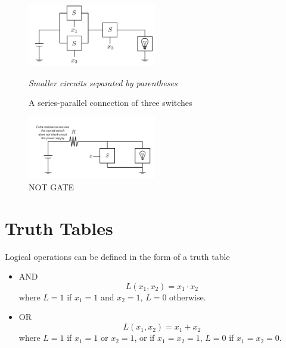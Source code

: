 \documentclass[12pt,openany, tikz,border=10pt]{book}
\begin{document}
\begin{figure}[htp] %
    \centering
    \includegraphics[width=0.5\textwidth]{circuits/6.1.3_3.png} %
    \caption*{A series-parallel connection of three switches}
     \newline
    \textit{Smaller circuits separated by parentheses}
  \end{figure}


  \begin{figure}[htp]
    \centering
    \includegraphics[width=0.5\textwidth]{circuits/6.1.3_4.png} %
    \caption*{NOT GATE} %
    \label{fig:notgate} %
    \medskip %
  \end{figure}
  \newpage
  \section{Truth Tables}
  Logical operations can be defined in the form of a truth table
  \begin{itemize}
      \item[] AND
      \begin{equation*}
          L(x_1, x_2) = x_1 \cdot x_2
      \end{equation*}
      where \( L = 1 \) if \( x_1 = 1 \) and \( x_2 = 1 \), \( L = 0 \) otherwise.
      
      \item[] OR
      \begin{equation*}
          L(x_1, x_2) = x_1 + x_2
      \end{equation*}
      where \( L = 1 \) if \( x_1 = 1 \) or \( x_2 = 1 \), or if \( x_1 = x_2 = 1 \), \( L = 0 \) if \( x_1 = x_2 = 0 \).
  \end{itemize}
  
\end{document}
